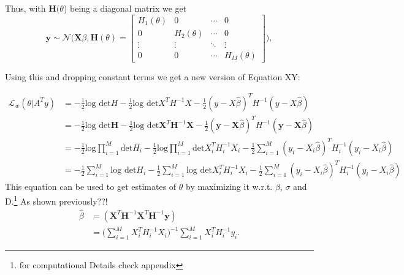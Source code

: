 \documentclass[a4paper,11pt]{article}
\begin{document}
Thus, with $\bm{H}(\theta$) being a diagonal matrix we get \begin{equation}
	\bm{y}\sim\mathcal{N}\biggl( \bm{X}\beta,\bm{H}(\theta)= \left[ \begin{array}{cccc}
	H_1(\theta) & 0 & \cdots & 0 \\
	0 & H_2(\theta)& \cdots& 0 \\
	\vdots & \vdots & \ddots& \vdots\\
	0 & 0& \cdots & H_M(\theta) \end{array} \right] \biggr),	
\end{equation}

Using this and dropping constant terms we get a new version of Equation XY:

\begin{equation}\label{eq:2} 
\begin{split}
{\mathcal{L}}_w (\theta| A^T y) &= -\frac{1}{2}\text{log det}H-\frac{1}{2}\text{log det} X^TH^{-1}X-\frac{1}{2}(y-X\widehat{\beta})^TH^{-1}(y-X\widehat{\beta}) \\
&= -\frac{1}{2}\text{log det}\bm{H}-\frac{1}{2}\text{log det}\bm{X}^T\bm{H}^{-1}\bm{X}-\frac{1}{2}(\bm{y}-\bm{X}\widehat{\beta})^TH^{-1}(\bm{y}-\bm{X}\widehat{\beta}) \\
&= -\frac{1}{2}\text{log}\prod_{i=1}^{M} \text{det}H_i-\frac{1}{2}\text{log}\prod_{i=1}^{M} \text{det} X_i^TH_i^{-1}X_i-\frac{1}{2}\sum_{i=1}^{M}(y_i-X_i\widehat{\beta})^TH_i^{-1}(y_i-X_i\widehat{\beta})\\
&= -\frac{1}{2}\sum_{i=1}^{M} \text{log det}H_i-\frac{1}{2}\sum_{i=1}^{M} \text{log det} X_i^TH_i^{-1}X_i-\frac{1}{2}\sum_{i=1}^{M}(y_i-X_i\widehat{\beta})^TH_i^{-1}(y_i-X_i\widehat{\beta})
\end{split}
\end{equation}
This equation can be used to get estimates of $\theta$ by maximizing it w.r.t. $\beta$, $\sigma$ and D.\footnote{for computational Details check appendix}
As shown previously??! 
\begin{equation}
\begin{split}
\widehat{\beta}&=(\bm{X}^T\bm{H}^{-1}\bm{X}^T\bm{H}^{-1}\bm{y})\\
&=\bigl(\sum_{i=1}^{M}X_i^TH_i^{-1}X_i\bigr)^{-1}\sum_{i=1}^{M}X_i^TH_i^{-1}y_i.
\end{split}
\end{equation}
\end{document}
